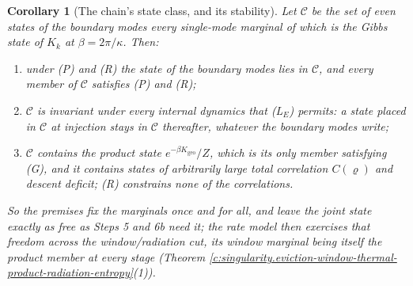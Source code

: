 \documentclass[11pt]{article}
\newtheorem{corollary}[theorem]{Corollary}
\theoremstyle{definition}
\theoremstyle{plain}
\begin{document}
\begin{corollary}[The chain's state class, and its stability]\label{c:singularity.chains-state-class-stability}
Let $\mathcal{C}$ be the set of even states of the boundary modes every single-mode marginal of which is the Gibbs state of $K_k$ at $\beta = 2\pi/\kappa$. Then:
\begin{enumerate}
\item under (P) and (R) the state of the boundary modes lies in $\mathcal{C}$, and every member of $\mathcal{C}$ satisfies (P) and (R);
\item $\mathcal{C}$ is invariant under every internal dynamics that (L$_E$) permits: a state placed in $\mathcal{C}$ at injection stays in $\mathcal{C}$ thereafter, whatever the boundary modes write;
\item $\mathcal{C}$ contains the product state $e^{-\beta K_{\mathrm{geo}}}/Z$, which is its only member satisfying (G), and it contains states of arbitrarily large total correlation $C(\varrho)$ and descent deficit; (R) constrains none of the correlations.
\end{enumerate}
So the premises fix the marginals once and for all, and leave the joint state exactly as free as Steps 5 and 6b need it; the rate model then exercises that freedom across the window/radiation cut, its window marginal being itself the product member at every stage (Theorem \ref{c:singularity.eviction-window-thermal-product-radiation-entropy}(1)).
\end{corollary}
\end{document}
